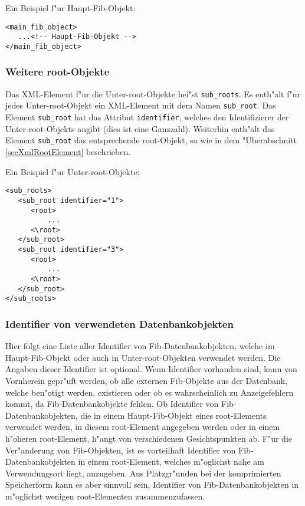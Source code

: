 \bigskip\noindent
Ein Beispiel f"ur Haupt-Fib-Objekt:
\begin{verbatim}
<main_fib_object>
   ...<!-- Haupt-Fib-Objekt -->
</main_fib_object>
\end{verbatim}


\subsubsection{Weitere root-Objekte}
\label{secXmlRootSubRoot}

Das XML-Element f"ur die Unter-root-Objekte hei"st \verb|sub_roots|. Es enth"alt f"ur jedes Unter-root-Objekt ein XML-Element mit dem Namen \verb|sub_root|. Das Element \verb|sub_root| hat das Attribut \verb|identifier|, welches den Identifizierer der Unter-root-Objekts angibt (dies ist eine Ganzzahl). Weiterhin enth"alt das Element \verb|sub_root| das entsprechende root-Objekt, so wie in dem "Uberabschnitt \ref{secXmlRootElement} beschrieben.

\bigskip\noindent
Ein Beispiel f"ur Unter-root-Objekte:
\begin{verbatim}
<sub_roots>
   <sub_root identifier="1">
      <root>
          ...
      <\root>
   </sub_root>
   <sub_root identifier="3">
      <root>
          ...
      <\root>
   </sub_root>
</sub_roots>
\end{verbatim}


\subsubsection{Identifier von verwendeten Datenbankobjekten}
\label{secXmlRootDBIdentifier}

Hier folgt eine Liste aller Identifier von Fib-Datenbankobjekten, welche im Haupt-Fib-Objekt oder auch in Unter-root-Objekten verwendet werden. Die Angaben dieser Identifier ist optional. Wenn Identifier vorhanden sind, kann von Vornherein gepr"uft werden, ob alle externen Fib-Objekte aus der Datenbank, welche ben"otigt werden, existieren oder ob es wahrscheinlich zu Anzeigefehlern kommt, da Fib-Datenbankobjekte fehlen. Ob Identifier von Fib-Datenbankobjekten, die in einem Haupt-Fib-Objekt eines root-Elements verwendet werden, in diesem root-Element angegeben werden oder in einem h"oheren root-Element, h"angt von verschiedenen Gesichtspunkten ab. F"ur die Ver"anderung von Fib-Objekten, ist es vorteilhaft Identifier von Fib-Datenbankobjekten in einem root-Element, welches m"oglichst nahe am Verwendungsort liegt, anzugeben. Aus Platzgr"unden bei der komprimierten Speicherform kann es aber sinnvoll sein, Identifier von Fib-Datenbankobjekten in m"oglichst wenigen root-Elementen zusammenzufassen.

